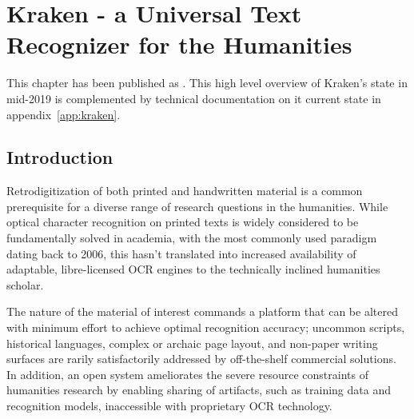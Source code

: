 \chapter{Kraken - a Universal Text Recognizer for the Humanities}
\thispagestyle{empty}
\vfill
This chapter has been published as . This high
level overview of Kraken's state in mid-2019 is complemented by technical
documentation on it current state in appendix~\ref{app:kraken}.
\label{ch:kraken}
\newpage

\section{Introduction}

Retrodigitization of both printed and handwritten material is a common
prerequisite for a diverse range of research questions in the humanities. While
optical character recognition on printed texts is widely considered to be
fundamentally solved in academia, with the most commonly used paradigm
\cite{graves2006connectionist} dating back to 2006, this hasn't translated into
increased availability of adaptable, libre-licensed OCR engines to the
technically inclined humanities scholar. 

The nature of the material of interest commands a platform that can be altered
with minimum effort to achieve optimal recognition accuracy; uncommon scripts,
historical languages, complex or archaic page layout, and non-paper writing
surfaces are rarily satisfactorily addressed by off-the-shelf commercial
solutions. In addition, an open system ameliorates the severe resource
constraints of humanities research by enabling sharing of artifacts, such as
training data and recognition models, inaccessible with proprietary OCR
technology.

